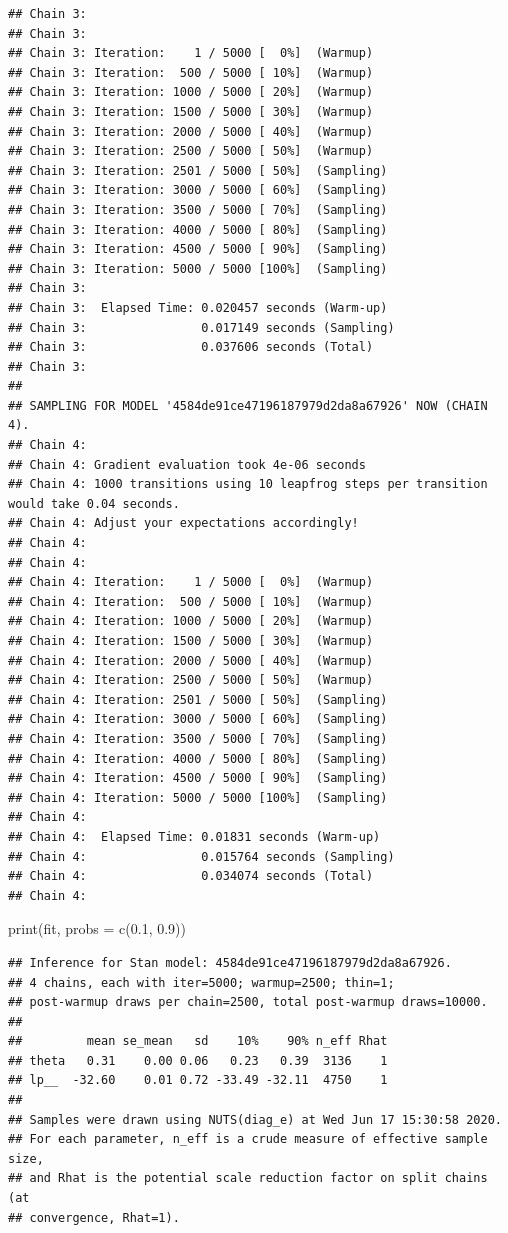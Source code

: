 \documentclass[
  12pt,
]{book}
\newenvironment{Shaded}{\begin{snugshade}}{\end{snugshade}}
\newcommand{\AttributeTok}[1]{\textcolor[rgb]{0.77,0.63,0.00}{#1}}
\newcommand{\FloatTok}[1]{\textcolor[rgb]{0.00,0.00,0.81}{#1}}
\newcommand{\FunctionTok}[1]{\textcolor[rgb]{0.00,0.00,0.00}{#1}}
\newcommand{\NormalTok}[1]{#1}
\theoremstyle{definition}
\theoremstyle{definition}
\theoremstyle{definition}
\theoremstyle{remark}
\begin{document}
\begin{verbatim}
## Chain 3: 
## Chain 3: 
## Chain 3: Iteration:    1 / 5000 [  0%]  (Warmup)
## Chain 3: Iteration:  500 / 5000 [ 10%]  (Warmup)
## Chain 3: Iteration: 1000 / 5000 [ 20%]  (Warmup)
## Chain 3: Iteration: 1500 / 5000 [ 30%]  (Warmup)
## Chain 3: Iteration: 2000 / 5000 [ 40%]  (Warmup)
## Chain 3: Iteration: 2500 / 5000 [ 50%]  (Warmup)
## Chain 3: Iteration: 2501 / 5000 [ 50%]  (Sampling)
## Chain 3: Iteration: 3000 / 5000 [ 60%]  (Sampling)
## Chain 3: Iteration: 3500 / 5000 [ 70%]  (Sampling)
## Chain 3: Iteration: 4000 / 5000 [ 80%]  (Sampling)
## Chain 3: Iteration: 4500 / 5000 [ 90%]  (Sampling)
## Chain 3: Iteration: 5000 / 5000 [100%]  (Sampling)
## Chain 3: 
## Chain 3:  Elapsed Time: 0.020457 seconds (Warm-up)
## Chain 3:                0.017149 seconds (Sampling)
## Chain 3:                0.037606 seconds (Total)
## Chain 3: 
## 
## SAMPLING FOR MODEL '4584de91ce47196187979d2da8a67926' NOW (CHAIN 4).
## Chain 4: 
## Chain 4: Gradient evaluation took 4e-06 seconds
## Chain 4: 1000 transitions using 10 leapfrog steps per transition would take 0.04 seconds.
## Chain 4: Adjust your expectations accordingly!
## Chain 4: 
## Chain 4: 
## Chain 4: Iteration:    1 / 5000 [  0%]  (Warmup)
## Chain 4: Iteration:  500 / 5000 [ 10%]  (Warmup)
## Chain 4: Iteration: 1000 / 5000 [ 20%]  (Warmup)
## Chain 4: Iteration: 1500 / 5000 [ 30%]  (Warmup)
## Chain 4: Iteration: 2000 / 5000 [ 40%]  (Warmup)
## Chain 4: Iteration: 2500 / 5000 [ 50%]  (Warmup)
## Chain 4: Iteration: 2501 / 5000 [ 50%]  (Sampling)
## Chain 4: Iteration: 3000 / 5000 [ 60%]  (Sampling)
## Chain 4: Iteration: 3500 / 5000 [ 70%]  (Sampling)
## Chain 4: Iteration: 4000 / 5000 [ 80%]  (Sampling)
## Chain 4: Iteration: 4500 / 5000 [ 90%]  (Sampling)
## Chain 4: Iteration: 5000 / 5000 [100%]  (Sampling)
## Chain 4: 
## Chain 4:  Elapsed Time: 0.01831 seconds (Warm-up)
## Chain 4:                0.015764 seconds (Sampling)
## Chain 4:                0.034074 seconds (Total)
## Chain 4:
\end{verbatim}

\begin{Shaded}
\begin{Highlighting}[]
\FunctionTok{print}\NormalTok{(fit, }\AttributeTok{probs =} \FunctionTok{c}\NormalTok{(}\FloatTok{0.1}\NormalTok{, }\FloatTok{0.9}\NormalTok{))}
\end{Highlighting}
\end{Shaded}

\begin{verbatim}
## Inference for Stan model: 4584de91ce47196187979d2da8a67926.
## 4 chains, each with iter=5000; warmup=2500; thin=1; 
## post-warmup draws per chain=2500, total post-warmup draws=10000.
## 
##         mean se_mean   sd    10%    90% n_eff Rhat
## theta   0.31    0.00 0.06   0.23   0.39  3136    1
## lp__  -32.60    0.01 0.72 -33.49 -32.11  4750    1
## 
## Samples were drawn using NUTS(diag_e) at Wed Jun 17 15:30:58 2020.
## For each parameter, n_eff is a crude measure of effective sample size,
## and Rhat is the potential scale reduction factor on split chains (at 
## convergence, Rhat=1).
\end{verbatim}
\end{document}
